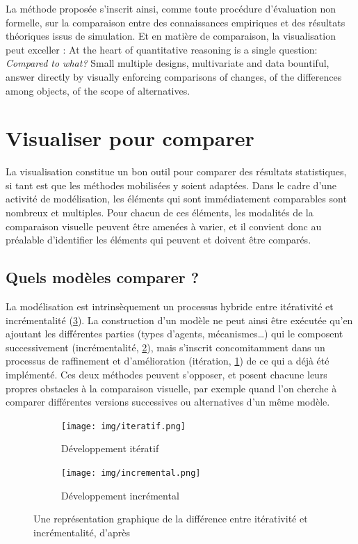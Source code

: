\documentclass[a4paper, 12pt]{article}
\begin{document}
La méthode proposée s'inscrit ainsi, comme toute procédure d'évaluation non formelle, sur la comparaison entre des connaissances empiriques et des résultats théoriques issus de simulation.
Et en matière de comparaison, la visualisation peut exceller :
\og At the heart of quantitative reasoning is a single question: \textit{Compared to what?} Small multiple designs, multivariate and data bountiful, answer directly by visually enforcing comparisons of changes, of the differences among objects, of the scope of alternatives.\fg{} \autocite[\ppno~67]{tufte_envisioning_1998}

\section{Visualiser pour comparer}

La visualisation constitue un bon outil pour comparer des résultats statistiques, si tant est que les méthodes mobilisées y soient adaptées.
Dans le cadre d'une activité de modélisation, les éléments qui sont immédiatement comparables sont nombreux et multiples.
Pour chacun de ces éléments, les modalités de la comparaison visuelle peuvent être amenées à varier, et il convient donc au préalable d'identifier les éléments qui peuvent et doivent être comparés.

\subsection{Quels modèles comparer ?}

La modélisation est intrinsèquement un processus hybride entre itérativité et incrémentalité (\cref{fig:iteratif-incremental}).
La construction d'un modèle ne peut ainsi être exécutée qu'en ajoutant les différentes parties (types d'agents, mécanismes\ldots) qui le composent successivement (incrémentalité, \cref{fig:incremental}), mais s'inscrit concomitamment dans un processus de raffinement et d'amélioration (itération, \cref{fig:iteratif}) de ce qui a déjà été implémenté.
Ces deux méthodes peuvent s'opposer, et posent chacune leurs propres obstacles à la comparaison visuelle, par exemple quand l'on cherche à comparer différentes versions successives ou alternatives d'un même modèle.

\begin{figure}[H]
	\begin{subfigure}{.45\linewidth}
		\texttt{[image: img/iteratif.png]}
		\caption{Développement itératif}
		\label{fig:iteratif}
	\end{subfigure}%
	\begin{subfigure}{.45\linewidth}
		\texttt{[image: img/incremental.png]}
		\caption{Développement incrémental}
		\label{fig:incremental}
	\end{subfigure}
	\caption{Une représentation graphique de la différence entre itérativité et incrémentalité, d'après \textcite{patton2017don}}
	\label{fig:iteratif-incremental}
\end{figure}
\end{document}
